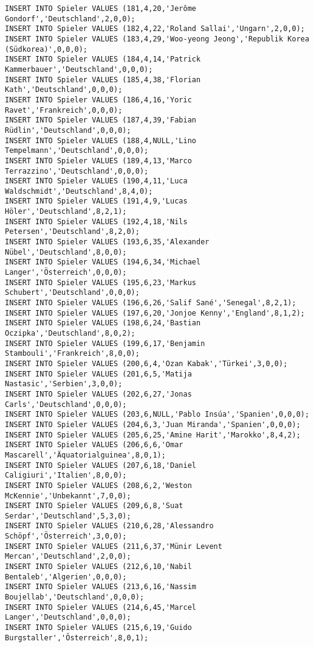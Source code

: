 \documentclass{bschlangaul-aufgabe}
\begin{document}
\begin{verbatim}
INSERT INTO Spieler VALUES (181,4,20,'Jerôme Gondorf','Deutschland',2,0,0);
INSERT INTO Spieler VALUES (182,4,22,'Roland Sallai','Ungarn',2,0,0);
INSERT INTO Spieler VALUES (183,4,29,'Woo-yeong Jeong','Republik Korea (Südkorea)',0,0,0);
INSERT INTO Spieler VALUES (184,4,14,'Patrick Kammerbauer','Deutschland',0,0,0);
INSERT INTO Spieler VALUES (185,4,38,'Florian Kath','Deutschland',0,0,0);
INSERT INTO Spieler VALUES (186,4,16,'Yoric Ravet','Frankreich',0,0,0);
INSERT INTO Spieler VALUES (187,4,39,'Fabian Rüdlin','Deutschland',0,0,0);
INSERT INTO Spieler VALUES (188,4,NULL,'Lino Tempelmann','Deutschland',0,0,0);
INSERT INTO Spieler VALUES (189,4,13,'Marco Terrazzino','Deutschland',0,0,0);
INSERT INTO Spieler VALUES (190,4,11,'Luca Waldschmidt','Deutschland',8,4,0);
INSERT INTO Spieler VALUES (191,4,9,'Lucas Höler','Deutschland',8,2,1);
INSERT INTO Spieler VALUES (192,4,18,'Nils Petersen','Deutschland',8,2,0);
INSERT INTO Spieler VALUES (193,6,35,'Alexander Nübel','Deutschland',8,0,0);
INSERT INTO Spieler VALUES (194,6,34,'Michael Langer','Österreich',0,0,0);
INSERT INTO Spieler VALUES (195,6,23,'Markus Schubert','Deutschland',0,0,0);
INSERT INTO Spieler VALUES (196,6,26,'Salif Sané','Senegal',8,2,1);
INSERT INTO Spieler VALUES (197,6,20,'Jonjoe Kenny','England',8,1,2);
INSERT INTO Spieler VALUES (198,6,24,'Bastian Oczipka','Deutschland',8,0,2);
INSERT INTO Spieler VALUES (199,6,17,'Benjamin Stambouli','Frankreich',8,0,0);
INSERT INTO Spieler VALUES (200,6,4,'Ozan Kabak','Türkei',3,0,0);
INSERT INTO Spieler VALUES (201,6,5,'Matija Nastasic','Serbien',3,0,0);
INSERT INTO Spieler VALUES (202,6,27,'Jonas Carls','Deutschland',0,0,0);
INSERT INTO Spieler VALUES (203,6,NULL,'Pablo Insúa','Spanien',0,0,0);
INSERT INTO Spieler VALUES (204,6,3,'Juan Miranda','Spanien',0,0,0);
INSERT INTO Spieler VALUES (205,6,25,'Amine Harit','Marokko',8,4,2);
INSERT INTO Spieler VALUES (206,6,6,'Omar Mascarell','Äquatorialguinea',8,0,1);
INSERT INTO Spieler VALUES (207,6,18,'Daniel Caligiuri','Italien',8,0,0);
INSERT INTO Spieler VALUES (208,6,2,'Weston McKennie','Unbekannt',7,0,0);
INSERT INTO Spieler VALUES (209,6,8,'Suat Serdar','Deutschland',5,3,0);
INSERT INTO Spieler VALUES (210,6,28,'Alessandro Schöpf','Österreich',3,0,0);
INSERT INTO Spieler VALUES (211,6,37,'Münir Levent Mercan','Deutschland',2,0,0);
INSERT INTO Spieler VALUES (212,6,10,'Nabil Bentaleb','Algerien',0,0,0);
INSERT INTO Spieler VALUES (213,6,16,'Nassim Boujellab','Deutschland',0,0,0);
INSERT INTO Spieler VALUES (214,6,45,'Marcel Langer','Deutschland',0,0,0);
INSERT INTO Spieler VALUES (215,6,19,'Guido Burgstaller','Österreich',8,0,1);

\end{verbatim}
\end{document}
